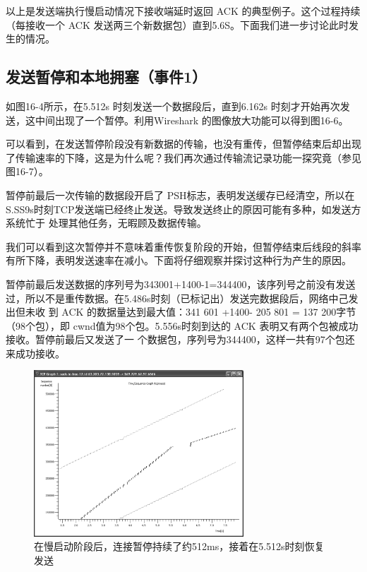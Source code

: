 以上是发送端执行慢启动情况下接收端延时返回 ACK 的典型例子。这个过程持续（每接收一个 ACK 发送两三个新数据包）直到5.6S。下面我们进一步讨论此时发生的情况。

\subsection{发送暂停和本地拥塞（事件1）}

如图16-4所示，在5.512s 时刻发送一个数据段后，直到6.162s 时刻才开始再次发送，这中间出现了一个暂停。利用Wireshark 的图像放大功能可以得到图16-6。

可以看到，在发送暂停阶段没有新数据的传输，也没有重传，但暂停结束后却出现了传输速率的下降，这是为什么呢？我们再次通过传输流记录功能一探究竟（参见图16-7）。

暂停前最后一次传输的数据段开启了 PSH标志，表明发送缓存已经清空，所以在S.SS9s时刻TCP发送端已经终止发送。导致发送终止的原因可能有多种，如发送方系统忙于
处理其他任务，无暇顾及数据传输。

我们可以看到这次暂停并不意味着重传恢复阶段的开始，但暂停结束后线段的斜率有所下降，表明发送速率在减小。下面将仔细观察并探讨这种行为产生的原因。

暂停前最后发送数据的序列号为343001+1400-1=344400，该序列号之前没有发送过，所以不是重传数据。在5.486s时刻（已标记出）发送完数据段后，网络中己发出但未收
到 ACK 的数据量达到最大值：341 601 +1400- 205 801 = 137 200字节（98个包），即 cwnd值为98个包。5.556s时刻到达的 ACK 表明又有两个包被成功接收。暂停前最后又发送了一
个数据包，序列号为344400，这样一共有97个包还来成功接收。

\begin{figure}[!htb]
    \centering
	\includegraphics[width=0.7\textwidth]{imgs/16/16-6.png}
	\caption{在慢启动阶段后，连接暂停持续了约512ms，接着在5.512s时刻恢复发送}
\end{figure}

